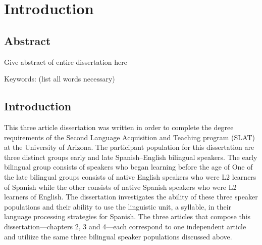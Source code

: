
\chapter{Introduction} %

\label{Chapter1} %


\section{Abstract}

Give abstract of entire dissertation here

Keywords: (list all words necessary)


\section{Introduction}

This three article dissertation was written in order to complete the degree requirements of the Second Language Acquisition and Teaching program (SLAT) at the University of Arizona. The participant population for this dissertation are three distinct groups early and late Spanish–English bilingual speakers. The early bilingual group consists of speakers who began learning before the age of %
One of the late bilingual groups consists of native English speakers who were L2 learners of Spanish while the other consists of native Spanish speakers who were L2 learners of English. The dissertation investigates the ability of these three speaker populations and their ability to use the linguistic unit, a syllable, in their language processing strategies for Spanish. The three articles that compose this dissertation---chapters 2, 3 and 4---each correspond to one independent article and utiliize the same three bilingual speaker populations discussed above.

